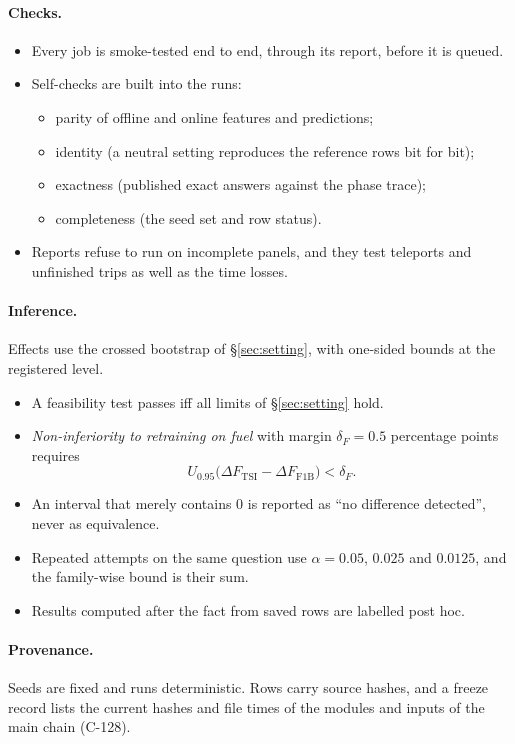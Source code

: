 \documentclass[11pt]{article}
\begin{document}
\paragraph{Checks.}
\begin{itemize}\setlength\itemsep{1pt}
\item Every job is smoke-tested end to end, through its report, before it is queued.
\item Self-checks are built into the runs:
\begin{itemize}\setlength\itemsep{0pt}
\item parity of offline and online features and predictions;
\item identity (a neutral setting reproduces the reference rows bit for bit);
\item exactness (published exact answers against the phase trace);
\item completeness (the seed set and row status).
\end{itemize}
\item Reports refuse to run on incomplete panels, and they test teleports and unfinished trips as well as the time losses.
\end{itemize}
\paragraph{Inference.} Effects use the crossed bootstrap of §\ref{sec:setting}, with one-sided bounds at the registered level.
\begin{itemize}\setlength\itemsep{1pt}
\item A feasibility test passes iff all limits of §\ref{sec:setting} hold.
\item \emph{Non-inferiority to retraining on fuel} with margin $\delta_F=0.5$ percentage points requires
\begin{equation}
U_{0.95}\big(\Delta F_{\mathrm{TSI}}-\Delta F_{\mathrm{F1B}}\big)<\delta_F.
\end{equation}
\item An interval that merely contains 0 is reported as ``no difference detected'', never as equivalence.
\item Repeated attempts on the same question use $\alpha=0.05$, $0.025$ and $0.0125$, and the family-wise bound is their sum.
\item Results computed after the fact from saved rows are labelled post hoc.
\end{itemize}
\paragraph{Provenance.} Seeds are fixed and runs deterministic. Rows carry source hashes, and a freeze record lists the current hashes and
file times of the modules and inputs of the main chain (C-128).
\end{document}
